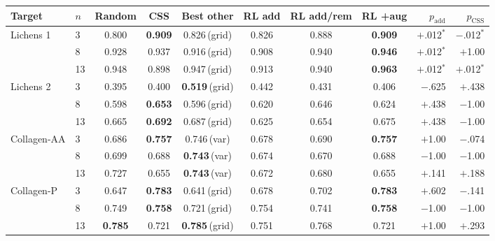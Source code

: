 {\small
\setlength{\tabcolsep}{3pt}
\begin{tabular}{llccccccrr}
\toprule
Target & $n$ & Random & CSS & Best other & RL add & RL add/rem & RL +aug & $p_{\mathrm{add}}$ & $p_{\mathrm{CSS}}$ \\
\midrule
Lichens 1 & 3 & 0.800 & \textbf{0.909} & 0.826\,{\scriptsize(grid)} & 0.826 & 0.888 & \textbf{0.909} & $+$.012$^{*}$ & $-$.012$^{*}$ \\
 & 8 & 0.928 & 0.937 & 0.916\,{\scriptsize(grid)} & 0.908 & 0.940 & \textbf{0.946} & $+$.012$^{*}$ & $+$1.00 \\
 & 13 & 0.948 & 0.898 & 0.947\,{\scriptsize(grid)} & 0.913 & 0.940 & \textbf{0.963} & $+$.012$^{*}$ & $+$.012$^{*}$ \\
\midrule
Lichens 2 & 3 & 0.395 & 0.400 & \textbf{0.519}\,{\scriptsize(grid)} & 0.442 & 0.431 & 0.406 & $-$.625 & $+$.438 \\
 & 8 & 0.598 & \textbf{0.653} & 0.596\,{\scriptsize(grid)} & 0.620 & 0.646 & 0.624 & $+$.438 & $-$1.00 \\
 & 13 & 0.665 & \textbf{0.692} & 0.687\,{\scriptsize(grid)} & 0.625 & 0.654 & 0.675 & $+$.438 & $-$1.00 \\
\midrule
Collagen-AA & 3 & 0.686 & \textbf{0.757} & 0.746\,{\scriptsize(var)} & 0.678 & 0.690 & \textbf{0.757} & $+$1.00 & $-$.074 \\
 & 8 & 0.699 & 0.688 & \textbf{0.743}\,{\scriptsize(var)} & 0.674 & 0.670 & 0.688 & $-$1.00 & $-$1.00 \\
 & 13 & 0.727 & 0.655 & \textbf{0.743}\,{\scriptsize(var)} & 0.672 & 0.680 & 0.655 & $+$.141 & $+$.188 \\
\midrule
Collagen-P & 3 & 0.647 & \textbf{0.783} & 0.641\,{\scriptsize(grid)} & 0.678 & 0.702 & \textbf{0.783} & $+$.602 & $-$.141 \\
 & 8 & 0.749 & \textbf{0.758} & 0.721\,{\scriptsize(grid)} & 0.754 & 0.741 & \textbf{0.758} & $-$1.00 & $-$1.00 \\
 & 13 & \textbf{0.785} & 0.721 & \textbf{0.785}\,{\scriptsize(grid)} & 0.751 & 0.768 & 0.721 & $+$1.00 & $+$.293 \\
\bottomrule
\end{tabular}
}
